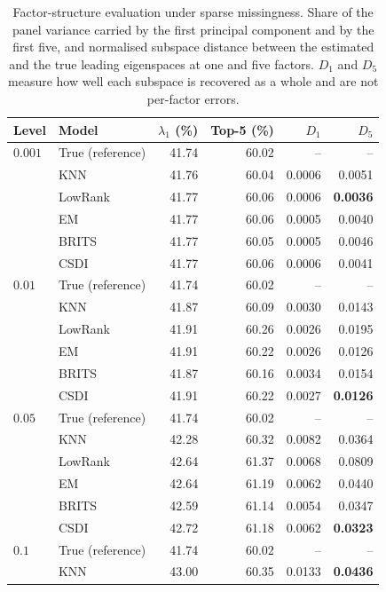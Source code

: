 \begin{table}[htbp]
  \centering
  \footnotesize
  \caption[Factor-structure evaluation under sparse missingness]{Factor-structure evaluation under sparse missingness. Share of the panel variance carried by the first principal component and by the first five, and normalised subspace distance between the estimated and the true leading eigenspaces at one and five factors. $D_1$ and $D_5$ measure how well each subspace is recovered as a whole and are not per-factor errors.}
  \label{tab:factors_sparses}
  \begin{tabular}{llrrrr}
    \toprule
    Level & Model & $\lambda_1$ (\%) & Top-5 (\%) & $D_1$ & $D_5$ \\
    \midrule
    $0.001$ & True (reference) & 41.74 & 60.02 & -- & -- \\
     & KNN & 41.76 & 60.04 & 0.0006 & 0.0051 \\
     & LowRank & 41.77 & 60.06 & 0.0006 & \textbf{0.0036} \\
     & EM & 41.77 & 60.06 & 0.0005 & 0.0040 \\
     & BRITS & 41.77 & 60.05 & 0.0005 & 0.0046 \\
     & CSDI & 41.77 & 60.06 & 0.0006 & 0.0041 \\
    \midrule
    $0.01$ & True (reference) & 41.74 & 60.02 & -- & -- \\
     & KNN & 41.87 & 60.09 & 0.0030 & 0.0143 \\
     & LowRank & 41.91 & 60.26 & 0.0026 & 0.0195 \\
     & EM & 41.91 & 60.22 & 0.0026 & 0.0126 \\
     & BRITS & 41.87 & 60.16 & 0.0034 & 0.0154 \\
     & CSDI & 41.91 & 60.22 & 0.0027 & \textbf{0.0126} \\
    \midrule
    $0.05$ & True (reference) & 41.74 & 60.02 & -- & -- \\
     & KNN & 42.28 & 60.32 & 0.0082 & 0.0364 \\
     & LowRank & 42.64 & 61.37 & 0.0068 & 0.0809 \\
     & EM & 42.64 & 61.19 & 0.0062 & 0.0440 \\
     & BRITS & 42.59 & 61.14 & 0.0054 & 0.0347 \\
     & CSDI & 42.72 & 61.18 & 0.0062 & \textbf{0.0323} \\
    \midrule
    $0.1$ & True (reference) & 41.74 & 60.02 & -- & -- \\
     & KNN & 43.00 & 60.35 & 0.0133 & \textbf{0.0436} \\

\end{tabular}
\end{table}
